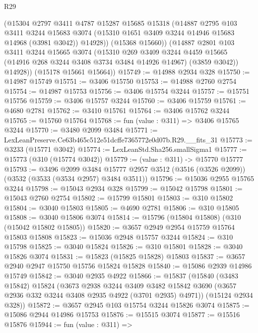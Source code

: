 \begin{lexlean}{R29}
\begin{coremodule}
          (@15304
            @2797
            @3411
            @4787
            @15287
            @15685
            @15318
            (@14887
              @2795
              @103
              @3411
              @3244
              @15683
              @3074
              (@15310 @1651 @3409 @3244 @14946 @15683 @14968 (@3981 @3042))
              @14928))
          (@15368 @15660))
        (@14887
          @2801
          @103
          @3411
          @3244
          @15665
          @3074
          (@15310
            @269
            @3409
            @3244
            @4459
            @15665
            (@14916 @268 @3244 @3408 @3734 @3484 @14926 @14967)
            (@3859 @3042))
          @14928))
      (@15178 @15661 @15664))
@15749 := @14988 @2934 @328
@15750 := @14987 @15749
@15751 := @3406 @15750
@15753 := @14988 @2760 @2754
@15754 := @14987 @15753
@15756 := @3406 @15754 @3244
@15757 := @15751 @15756
@15759 := @3406 @15757 @3244
@15760 := @3406 @15759
@15761 := @4680 @2781
@15762 := @3410 @15761
@15764 := @3406 @15762 @3244
@15765 := @15760 @15764
@15768 := fun (value : @311) => @3406 @15765 @3244
@15770 := @3480 @2099 @3484
@15771 := LexLeanPreserve.Ce63b465c512e51dcffe7365772e0d07b.R29.__fits_31
@15773 := @3233 (@15771 @3042)
@15774 := LexLeanStd.Sha256.smallSigma1
@15777 := @15773 (@310 (@15774 @3042))
@15779 := (value : @311) -> @15770 @15777
@15793 := @3496
    @2099
    @3484
    @15777
    @2957
    @3512
    (@3516 (@3526 @2099))
    (@3532 (@3533 (@3534 @2957) @3484 @3511))
@15796 := @15036 @2955 @15765 @3244
@15798 := @15043 @2934 @328
@15799 := @15042 @15798
@15801 := @15043 @2760 @2754
@15802 := @15799 @15801
@15803 := @310 @15802
@15804 := @3040 @15803
@15805 := @4690 @2781
@15806 := @310 @15805
@15808 := @3040 @15806 @3074
@15814 := @15796 (@15804 @15808) (@310 (@15042 @15802 @15805))
@15820 := @3657 @2949 @2954 @15759 @15764 @15803 @15808
@15823 := @15036 @2948 @15757 @3244
@15824 := @310 @15798
@15825 := @3040 @15824
@15826 := @310 @15801
@15828 := @3040 @15826 @3074
@15831 := @15823 (@15825 @15828) @15803
@15837 := @3657 @2940 @2947 @15750 @15756 @15824 @15828
@15840 := @15086 @2939 @14986 @15749
@15842 := @3040 @2935 @4922
@15866 := @15837
    (@15840
      (@3483 @15842)
      @15824
      (@3673
        @2938
        @3244
        @3409
        @3482
        @15842
        @3690
        (@3657 @2936 @332 @3244 @3408 @2935 @4922 (@3701 @2935) @4971))
      (@15124 @2934 @328))
@15872 := @3657 @2945 @103 @15754 @3244 @15826 @3074
@15875 := @15086 @2944 @14986 @15753
@15876 := @15515 @3074
@15877 := @15516 @15876
@15944 := fun (value : @311) =>

\end{coremodule}
\end{lexlean}
